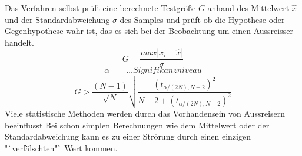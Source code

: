 \documentclass[11pt]{report}
\begin{document}
Das Verfahren selbst prüft eine berechnete Testgröße $G$ anhand des Mittelwert $\hat{x}$ und der Standardabweichung $\sigma$ des Samples und prüft ob die Hypothese oder Gegenhypothese wahr ist, das es sich bei der Beobachtung um einen Aussreisser handelt. \newline
\begin{equation}
G=\frac{max\left|x_i - \hat{x}\right|}{\sigma}
\end{equation}\newline
\begin{equation}
\alpha \qquad \dots Signifikanzniveau
\end{equation}\newline
\begin{equation}
G> \frac{(N-1)}{\sqrt{N}}\sqrt{\frac{(t_{\alpha / (2N),N-2})^2}{N-2+(t_{\alpha / (2N),N-2})^2}}
\end{equation}\newline
Viele statistische Methoden werden durch das Vorhandensein von Aussreisern beeinflusst  Bei schon simplen Berechnungen wie dem Mittelwert oder der Standardabweichung kann es zu einer Strörung durch einen einzigen "`verfälschten"` Wert kommen.
\end{document}
